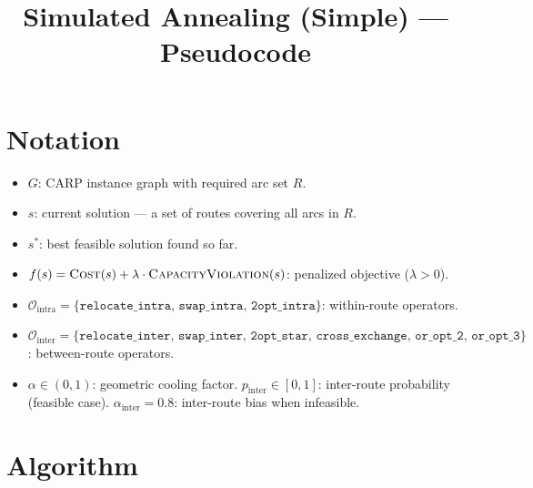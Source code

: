 \documentclass[12pt, a4paper]{article}
\title{Simulated Annealing (Simple) --- Pseudocode}
\author{}
\date{}
\begin{document}
\maketitle

\section*{Notation}

\begin{itemize}
    \item $G$: CARP instance graph with required arc set $R$.
    \item $s$: current solution --- a set of routes covering all arcs in $R$.
    \item $s^{*}$: best feasible solution found so far.
    \item $f(s) = \textsc{Cost}(s) + \lambda \cdot \textsc{CapacityViolation}(s)$: penalized objective ($\lambda > 0$).
    \item $\mathcal{O}_{\mathrm{intra}} = \{\texttt{relocate\_intra},\, \texttt{swap\_intra},\, \texttt{2opt\_intra}\}$: within-route operators.
    \item $\mathcal{O}_{\mathrm{inter}} = \{\texttt{relocate\_inter},\, \texttt{swap\_inter},\, \texttt{2opt\_star},\, \texttt{cross\_exchange},\, \texttt{or\_opt\_2},\, \texttt{or\_opt\_3}\}$: between-route operators.
    \item $\alpha \in (0,1)$: geometric cooling factor. \quad $p_{\mathrm{inter}} \in [0,1]$: inter-route probability (feasible case). \quad $\alpha_{\mathrm{inter}} = 0.8$: inter-route bias when infeasible.
\end{itemize}

\section*{Algorithm}
\end{document}
